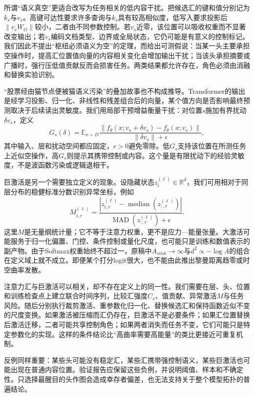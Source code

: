 \label{sec:semantic_vacuum_theorem}
所谓“语义真空”更适合改写为任务相关的低内容干扰。把候选汇的键和值分别记为$k_s$与$v_s$。高键可达性要求许多查询与$k_s$具有较高相似度，低写入要求投影后$\|v_sW_O\|$较小，二者由不同参数控制。若$v_s$近零，该位置可以吸收权重而不显著改变输出；若$v_s$编码文档类型、边界或全局状态，它仍可能是有意义的控制标记。我们因此不提出“枢纽必须语义为空”的定理，而给出可测假说：当某一头主要承担空操作时，提高汇位置值向量的内容相关变化会增加输出干扰；当该头承担摘要或广播时，强行压低值贡献反而会损害任务。两类结果都允许存在，角色必须由消融和替换实验识别。

“股票经由猫节点便被猫语义污染”的叠加故事也不构成推导。Transformer的输出是经学习投影、归一化、非线性和残差组合后的向量，某个值方向是否影响最终预测取决于后续读出灵敏度。我们用局部干预增益衡量干扰：对位置$s$施加有界扰动$\delta v_s$，定义
\begin{equation}
 G_s(\delta)=\mathbb{E}_{x\sim D}
 \frac{\|f_{\theta}(x;v_s+\delta v_s)-f_{\theta}(x;v_s)\|}
 {\|\delta v_s\|+\epsilon},
\end{equation}
其中输入、层和扰动空间都应固定，$\epsilon>0$避免零除。低$G_s$支持该位置在所测任务上近似空操作，高$G_s$则提示其携带控制或内容。这个量是有限扰动下的经验灵敏度，不是波函数污染或逻辑退相干。

\label{sec:metric_singularity_energy}
巨激活是另一个需要独立定义的现象。设隐藏状态$z_i^{(\ell)}\in\mathbb{R}^{d}$，我们可用相对于同层分布的稳健标准分数识别异常坐标，例如
\begin{equation}
 M_{i,r}^{(\ell)}=
 \frac{|z_{i,r}^{(\ell)}-\operatorname{median}(z_{:,r}^{(\ell)})|}
 {\operatorname{MAD}(z_{:,r}^{(\ell)})+\epsilon}.
\end{equation}
这里$M$是无量纲统计量；它不等于注意力权重，更不是应力—能量张量。大激活可能服务于归一化偏置、门控、条件控制或量化尺度，也可能只是训练和数值表示的副产物。由于Softmax权重始终不超过一，原稿中$A_{sink}\to\infty$与$d^2\propto-\log A$的组合在定义域上就不成立。即便某个打分logit很大，也不能由此推出黎曼距离趋零或时空曲率发散。

注意力汇与巨激活可以相关，却不存在定义上的同一性。我们需要在层、头、位置和训练检查点上建立联合时间序列，比较汇强度$C_s$、值贡献、异常激活$M$与任务风险。随后分别执行裁剪激活、重参数化归一化、替换候选汇和保持函数近似不变的尺度变换。如果激活被压缩而汇仍存在，巨激活不是必要条件；如果汇位置替换后激活迁移，二者可能共享控制角色；如果两者消失而任务不变，它们可能只是特定参数化的实现。这样的条件结论比“高曲率需要高能量”的类比更接近可重复机制。

反例同样重要：某些头可能没有稳定汇，某些汇携带强控制语义，某些巨激活也可能出现在普通内容位置。验证报告应保留这些负例，并说明阈值、样本和不确定性。只选择最醒目的头作图会造成幸存者偏差，也无法支持关于整个模型拓扑的普遍结论。


